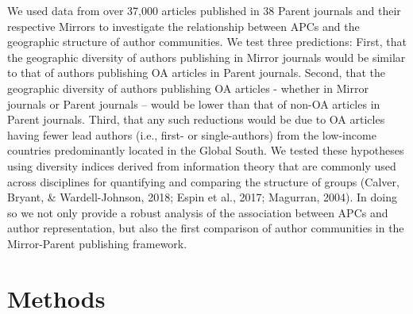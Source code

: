 \documentclass[
  english,
  man]{apa6}
\begin{document}
We used data from over 37,000 articles published in 38 Parent journals and their respective Mirrors to investigate the relationship between APCs and the geographic structure of author communities. We test three predictions: First, that the geographic diversity of authors publishing in Mirror journals would be similar to that of authors publishing OA articles in Parent journals. Second, that the geographic diversity of authors publishing OA articles - whether in Mirror journals or Parent journals -- would be lower than that of non-OA articles in Parent journals. Third, that any such reductions would be due to OA articles having fewer lead authors (i.e., first- or single-authors) from the low-income countries predominantly located in the Global South. We tested these hypotheses using diversity indices derived from information theory that are commonly used across disciplines for quantifying and comparing the structure of groups (Calver, Bryant, \& Wardell-Johnson, 2018; Espin et al., 2017; Magurran, 2004). In doing so we not only provide a robust analysis of the association between APCs and author representation, but also the first comparison of author communities in the Mirror-Parent publishing framework.

\hypertarget{methods}{%
\section{Methods}\label{methods}}
\end{document}
